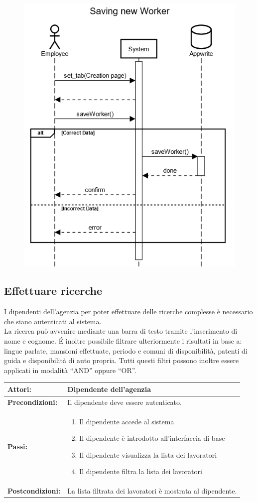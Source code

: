 \documentclass[a4paper, oneside, 12pt]{article}
\begin{document}
\begin{figure}[h!]
	\centering
	\includegraphics[width = 8 cm]{images/aggiunta}
	\label{fig:Inserimento lavoratore}
\end{figure}

\newpage

\subsection{Effettuare ricerche}
I dipendenti dell'agenzia per poter effettuare delle ricerche complesse è necessario che siano autenticati 
al sistema. \\
La ricerca può avvenire mediante una barra di testo tramite l'inserimento di nome e cognome.
\'E inoltre possibile filtrare ulteriormente i risultati in base a: lingue parlate, mansioni effettuate, periodo e comuni di disponibilità,
patenti di guida e disponibilità di auto propria. Tutti questi filtri possono inoltre essere applicati in modalità “AND” oppure “OR”. \\

\begin{tabular}{ | l | p{11cm} | } 
	\hline
	\textbf{Attori:} & Dipendente dell'agenzia  \\ 
	\hline
	\textbf{Precondizioni:} & Il dipendente deve essere autenticato. \\
	\hline
	\textbf{Passi:} &
		\begin{enumerate}
			\item Il dipendente accede al sistema
			\item Il dipendente è introdotto all'interfaccia di base
			\item Il dipendente visualizza la lista dei lavoratori
			\item Il dipendente filtra la lista dei lavoratori
		\end{enumerate} \\
	\hline
	\textbf{Postcondizioni:} & La lista filtrata dei lavoratori è mostrata al dipendente. \\
	\hline
  \end{tabular}
\end{document}
